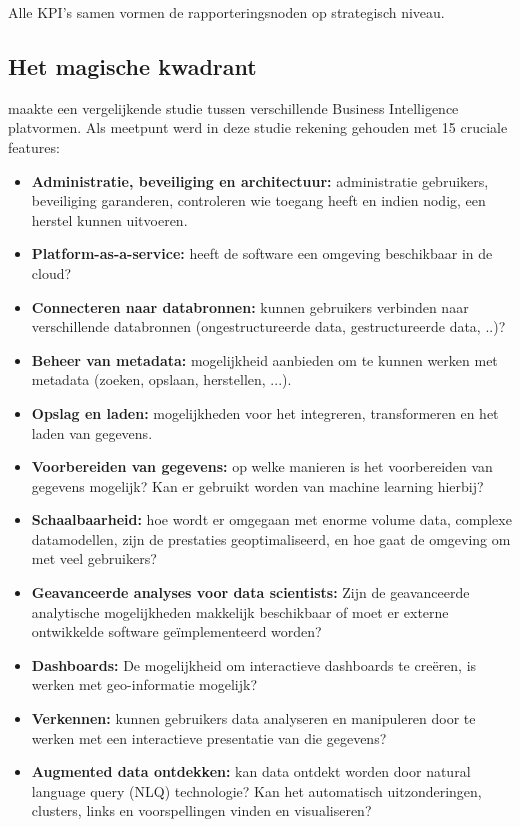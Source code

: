 Alle KPI's samen vormen de rapporteringsnoden op strategisch niveau.

\subsection{Het magische kwadrant}
\textcite{Gartner2019} maakte een vergelijkende studie tussen verschillende Business Intelligence platvormen. Als meetpunt werd in deze studie rekening gehouden met 15 cruciale features:
\begin{itemize}
	\item \textbf{Administratie, beveiliging en architectuur:} administratie gebruikers, beveiliging garanderen, controleren wie toegang heeft en indien nodig, een herstel kunnen uitvoeren.
	\item \textbf{Platform-as-a-service:} heeft de software een omgeving beschikbaar in de cloud?
	\item \textbf{Connecteren naar databronnen:} kunnen gebruikers verbinden naar verschillende databronnen (ongestructureerde data, gestructureerde data, ..)?
	\item \textbf{Beheer van metadata:} mogelijkheid aanbieden om te kunnen werken met metadata (zoeken, opslaan, herstellen, ...).
	\item \textbf{Opslag en laden:} mogelijkheden voor het integreren, transformeren en het laden van gegevens.
	\item \textbf{Voorbereiden van gegevens:}  op welke manieren is het voorbereiden van gegevens mogelijk? Kan er gebruikt worden van machine learning hierbij?
	\item \textbf{Schaalbaarheid:} hoe wordt er omgegaan met enorme volume data, complexe datamodellen, zijn de prestaties geoptimaliseerd, en hoe gaat de omgeving om met veel gebruikers?
	\item \textbf{Geavanceerde analyses voor data scientists:} Zijn de geavanceerde analytische mogelijkheden makkelijk beschikbaar of moet er externe ontwikkelde software geïmplementeerd worden?
	\item \textbf{Dashboards:} De mogelijkheid om interactieve dashboards te creëren, is werken met geo-informatie mogelijk?
	\item \textbf{Verkennen:} kunnen gebruikers data analyseren en manipuleren door te werken met een interactieve presentatie van die gegevens?
	\item \textbf{Augmented data ontdekken:} kan data ontdekt worden door natural language query (NLQ) technologie? Kan het automatisch uitzonderingen, clusters, links en voorspellingen vinden en visualiseren?

\end{itemize}
